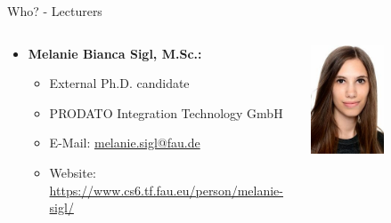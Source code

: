 \begin{frame}{Who? - Lecturers}
	\begin{columns}
		\begin{column}{0.8\textwidth}
			\begin{itemize}
				\item \textbf{Melanie Bianca Sigl, M.Sc.:}
				      \begin{itemize}
					      \item External Ph.D. candidate
					      \item PRODATO Integration Technology GmbH
					      \item E-Mail: \href{mailto:melanie.sigl@fau.de}{melanie.sigl@fau.de}
					      \item Website: \url{https://www.cs6.tf.fau.eu/person/melanie-sigl/}
				      \end{itemize}
			\end{itemize}
		\end{column}
		\begin{column}{0.2\textwidth}
			\begin{center}
				\includegraphics[width=0.5\textwidth]{img/melanie_b_sigl.jpg}
			\end{center}
		\end{column}
	\end{columns}


\end{frame}
